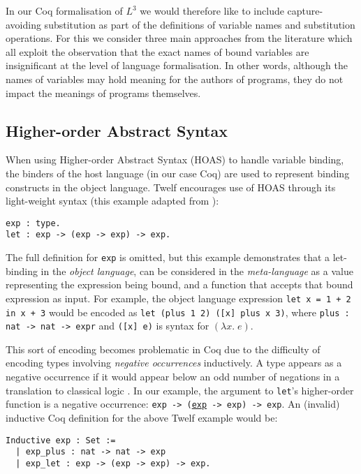 \documentclass[]{unswthesis}
\let\c\texttt
\let\i\textit
\begin{document}
In our Coq formalisation of $L^3$ we would therefore like to include capture-avoiding substitution as part of the definitions of variable names and substitution operations. For this we consider three main approaches from the literature which all exploit the observation that the exact names of bound variables are insignificant at the level of language formalisation. In other words, although the names of variables may hold meaning for the authors of programs, they do not impact the meanings of programs themselves.

\subsection{Higher-order Abstract Syntax}

When using Higher-order Abstract Syntax (HOAS) to handle variable binding, the binders of the host language (in our case Coq) are used to represent binding constructs in the object language. Twelf encourages use of HOAS through its light-weight syntax (this example adapted from \cite{twelf08}):

\begin{verbatim}
exp : type.
let : exp -> (exp -> exp) -> exp.
\end{verbatim}

The full definition for \c{exp} is omitted, but this example demonstrates that a let-binding in the \i{object language}, can be considered in the \i{meta-language} as a value representing the expression being bound, and a function that accepts that bound expression as input. For example, the object language expression \c{let x = 1 + 2 in x + 3} would be encoded as \c{let (plus 1 2) ([x] plus x 3)}, where \c{plus : nat -> nat -> expr} and \c{([x] e)} is syntax for $(\lambda x. \; e)$.

This sort of encoding becomes problematic in Coq due to the difficulty of encoding types involving \i{negative occurrences} inductively. A type appears as a negative occurrence if it would appear below an odd number of negations in a translation to classical logic \cite{tapl}. In our example, the argument to \c{let}'s higher-order function is a negative occurrence: \c{exp -> (\underline{exp} -> exp) -> exp}. An (invalid) inductive Coq definition for the above Twelf example would be:

\begin{verbatim}
Inductive exp : Set :=
  | exp_plus : nat -> nat -> exp
  | exp_let : exp -> (exp -> exp) -> exp.
\end{verbatim}
\end{document}

